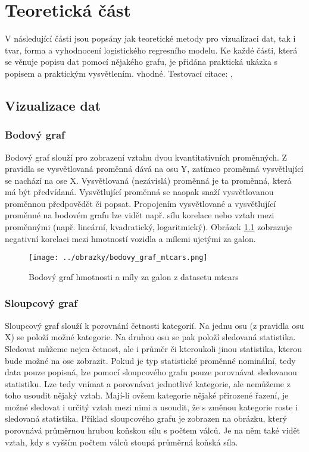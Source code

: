 \chapter{Teoretická část}
V následující části jsou popsány jak teoretické metody pro vizualizaci dat, tak i tvar, forma a vyhodnocení logistického regresního modelu. 
Ke každé části, která se věnuje popisu dat pomocí nějakého grafu, je přidána praktická ukázka s popisem a praktickým vysvětlením.
vhodné.
Testovací citace: \cite{Hebak2015}, \cite{Kleinbaum2010}

\section{Vizualizace dat} \label{sec:vizualizace_dat}
\subsection{Bodový graf}
Bodový graf slouží pro zobrazení vztahu dvou kvantitativních proměnných. Z pravidla se vysvětlovaná proměnná dává na osu Y,
zatímco proměnná vysvětlující se nachází na ose X. Vysvětlovaná (nezávislá) proměnná je ta proměnná, která má být předvídaná.
Vysvětlující proměnná se naopak snaží vysvětlovanou proměnnou předpovědět či popsat. Propojením vysvětlované a vysvětlující proměnné
na bodovém grafu lze vidět např. sílu korelace nebo vztah mezi proměnnými (např. lineární, kvadratický, logaritmický). Obrázek \ref{fig:bodovy_graf_mtcars} zobrazuje
negativní korelaci mezi hmotností vozidla a mílemi ujetými za galon.

\begin{figure}[H]
    \centering
    \texttt{[image: ../obrazky/bodovy\_graf\_mtcars.png]}
    \caption{Bodový graf hmotnosti a míly za galon z datasetu mtcars} 
    \label{fig:bodovy_graf_mtcars}
\end{figure}

\subsection{Sloupcový graf}
Sloupcový graf slouží k porovnání četnosti kategorií. Na jednu osu (z pravidla osu X) se položí možné kategorie. Na druhou osu
se pak položí sledovaná statistika.
{\color{red}
Sledovat můžeme nejen četnost, ale i průměr či kteroukoli jinou statistika, kterou bude možné na ose zobrazit.
Pokud je typ statistické proměnné nominální, tedy data pouze popisná, lze pomocí sloupcového grafu pouze porovnávat sledovanou statistiku. Lze tedy
vnímat a porovnávat jednotlivé kategorie, ale nemůžeme z toho usoudit nějaký vztah.
Mají-li ovšem kategorie nějaké přirozené řazení, je možné sledovat i určitý vztah mezi nimi a usoudit, že s změnou kategorie roste i sledovaná statistika.
Příklad sloupcového grafu je zobrazen na obrázku, který porovnává průměrnou hrubou koňskou sílu s počtem válců.
Je na něm také vidět vztah, kdy s vyšším počtem válců stoupá průměrná koňská síla.
}


